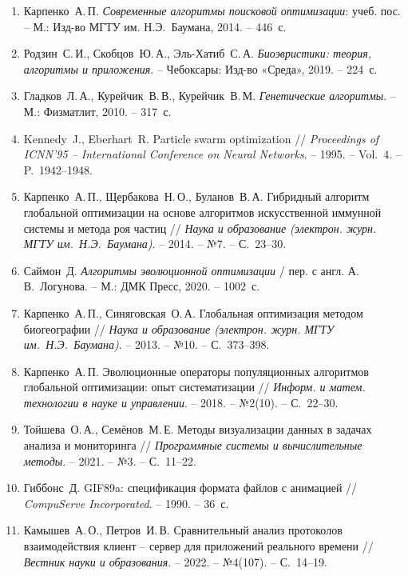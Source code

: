 \documentclass[14pt, russian]{scrartcl}
\begin{document}
\begin{enumerate}
  \item Карпенко~А.\,П. \textit{Современные алгоритмы поисковой оптимизации}:
  учеб. пос. – М.: Изд-во МГТУ им. Н.Э.~Баумана, 2014. – 446~с.

  \item Родзин~С.\,И., Скобцов~Ю.\,А., Эль-Хатиб~С.\,А. \textit{Биоэвристики:
  теория, алгоритмы и приложения}. – Чебоксары: Изд-во «Среда», 2019. –
  224~с.

  \item Гладков~Л.\,А., Курейчик~В.\,В., Курейчик~В.\,М. \textit{Генетические
  алгоритмы}. – М.: Физматлит, 2010. – 317~с.

  \item Kennedy~J., Eberhart~R. Particle swarm optimization // \textit{Proceedings
  of ICNN'95 – International Conference on Neural Networks}. – 1995. –
  Vol.~4. – P.~1942–1948.

  \item Карпенко~А.\,П., Щербакова~Н.\,О., Буланов~В.\,А. Гибридный алгоритм
  глобальной оптимизации на основе алгоритмов искусственной иммунной системы
  и метода роя частиц // \textit{Наука и образование (электрон. журн. МГТУ
  им.~Н.Э.~Баумана)}. – 2014. – №7. – С.~23–30.

  \item Саймон~Д. \textit{Алгоритмы эволюционной оптимизации} / пер. с англ.
  А.\,В.~Логунова. – М.: ДМК Пресс, 2020. – 1002~с.

  \item Карпенко~А.\,П., Синяговская~О.\,А. Глобальная оптимизация методом
  биогеографии // \textit{Наука и образование (электрон. журн. МГТУ
  им.~Н.Э.~Баумана)}. – 2013. – №10. – С.~373–398.

  \item Карпенко~А.\,П. Эволюционные операторы популяционных алгоритмов
  глобальной оптимизации: опыт систематизации // \textit{Информ. и матем.
  технологии в науке и управлении}. – 2018. – №2(10). – С.~22–30.

  \item Тойшева~О.\,А., Семёнов~М.\,Е. Методы визуализации данных в задачах
  анализа и мониторинга // \textit{Программные системы и вычислительные
  методы}. – 2021. – №3. – С.~11–22.

  \item Гиббонс~Д. GIF89a: спецификация формата файлов с анимацией //
  \textit{CompuServe Incorporated}. – 1990. – 36~с.

  \item Камышев~А.\,О., Петров~И.\,В. Сравнительный анализ протоколов
  взаимодействия клиент -- сервер для приложений реального времени //
  \textit{Вестник науки и образования}. – 2022. – №4(107). – С.~14–19.


\end{enumerate}
\end{document}
